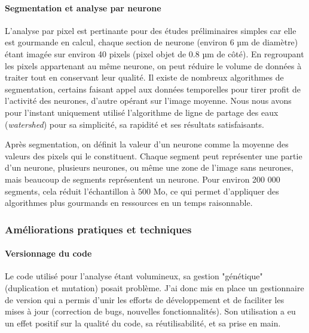 \paragraph{Segmentation et analyse par neurone}

L'analyse par pixel est pertinante pour des études préliminaires simples car elle est gourmande en calcul, chaque section de neurone (environ 6 µm de diamètre) étant imagée sur environ 40 pixels (pixel objet de 0.8 µm de côté). En regroupant les pixels appartenant au même neurone, on peut réduire le volume de données à traiter tout en conservant leur qualité. Il existe de nombreux algorithmes de segmentation, certains faisant appel aux données temporelles pour tirer profit de l'activité des neurones, d'autre opérant sur l'image moyenne. Nous nous avons pour l'instant uniquement utilisé l'algorithme de ligne de partage des eaux (\emph{watershed}) pour sa simplicité, sa rapidité et ses résultats satisfaisants.


Après segmentation, on définit la valeur d'un neurone comme la moyenne des valeurs des pixels qui le constituent. Chaque segment peut représenter une partie d'un neurone, plusieurs neurones, ou même une zone de l'image sans neurones, mais beaucoup de segments représentent un neurone. Pour environ 200 000 segments, cela réduit l'échantillon à 500 Mo, ce qui permet d'appliquer des algorithmes plus gourmands en ressources en un temps raisonnable.




\subsubsection{Améliorations pratiques et techniques}

\paragraph{Versionnage du code}
Le code utilisé pour l'analyse étant volumineux, sa gestion "génétique" (duplication et mutation) posait problème. J'ai donc mis en place un gestionnaire de version qui a permis d'unir les efforts de développement et de faciliter les mises à jour (correction de bugs, nouvelles fonctionnalités). Son utilisation a eu un effet positif sur la qualité du code, sa réutilisabilité, et sa prise en main. 

